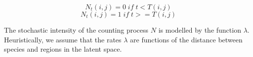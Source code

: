 \documentclass[mscthesis]{usiinfthesis}
\begin{document}
\[
N_t(i, j) = 0 \; if \; t < T(i, j)
\]
\[
N_t(i, j) = 1 \; if \; t >= T(i, j)
\]


The stochastic intensity of the counting process $N$ is modelled by the function $\lambda$. Heuristically, we assume that the rates $\lambda$ are functions of the distance between species and regions in the latent space. 


%
 
\end{document}
